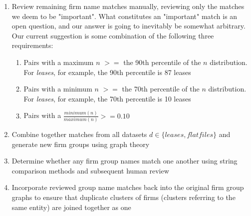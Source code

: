 \documentclass{article}
\begin{document}
\begin{enumerate}
     \item Review remaining firm name matches manually, reviewing only the matches we deem to be "important". What constitutes an "important" match is an open question, and our answer is going to inevitably be somewhat arbitrary. Our current suggestion is some combination of the following three requirements:
    \begin{enumerate}
    \item Pairs with a maximum $n$ $>=$ the 90th percentile of the $n$ distribution. For \textit{leases}, for example, the 90th percentile is 87 leases
    \item Pairs with a minimum  $n$ $>=$ the 70th percentile of the $n$ distribution. For \textit{leases}, for example, the  70th  percentile is 10 leases
    \item Pairs with a $\frac{minimum(n)}{maximum(n)} >= 0.10$
    \end{enumerate} 
    
    \item Combine together matches from all datasets $d \in \{leases, flatfiles\}$ and generate new firm groups using graph theory
    
    \item Determine whether any firm group names match one another using string comparison methods and subsequent human review
    
    \item Incorporate reviewed group name matches back into the original firm group graphs to ensure that duplicate clusters of firms (clusters referring to the same entity) are joined together as one 
\end{enumerate}
\end{document}
